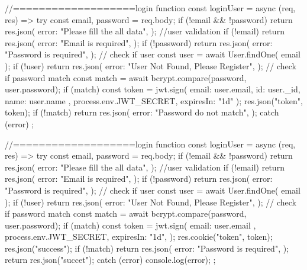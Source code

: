 //===================login function
const loginUser = async (req, res) => {
  try {
    const { email, password } = req.body;
    if (!email && !password) {
      return res.json({
        error: "Please fill the all data",
      });
    }
    //user validation
    if (!email) {
      return res.json({
        error: "Email is required",
      });
    }
    if (!password) {
      return res.json({
        error: "Password is required",
      });
    }
    // check if user
    const user = await User.findOne({ email });
    if (!user) {
      return res.json({
        error: "User Not Found, Please Register",
      });
    }
    // check if password match
    const match = await bcrypt.compare(password, user.password);
    if (match) {
      const token = jwt.sign(
        { email: user.email, id: user._id, name: user.name },
        process.env.JWT_SECRET,
        { expiresIn: "1d" }
      );
      res.json("token", token);
    }
    if (!match) {
      return res.json({
        error: "Password do not match",
      });
    }
  } catch (error) {}
};



//===================login function
const loginUser = async (req, res) => {
  try {
    const { email, password } = req.body;
    if (!email && !password) {
      return res.json({
        error: "Please fill the all data",
      });
    }
    //user validation
    if (!email) {
      return res.json({
        error: "Email is required",
      });
    }
    if (!password) {
      return res.json({
        error: "Password is required",
      });
    }
    // check if user
    const user = await User.findOne({ email });
    if (!user) {
      return res.json({
        error: "User Not Found, Please Register",
      });
    }
    // check if password match
    const match = await bcrypt.compare(password, user.password);
    if (match) {
      const token = jwt.sign({ email: user.email }, process.env.JWT_SECRET, {
        expiresIn: "1d",
      });
      res.cookie("token", token);
      res.json("success");
    }
    if (!match) {
      return res.json({
        error: "Password is required",
      });
    }
    return res.json("succet");
  } catch (error) {
    console.log(error);
  }
};